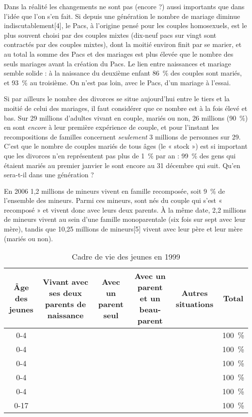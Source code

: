 
 Dans la réalité les changements ne sont pas (encore ?) aussi importants que dans l'idée que l'on s'en fait. Si depuis une génération le nombre de mariage diminue indiscutablement[4], le Pacs, à l'origine pensé pour les couples homosexuels, est le plus souvent choisi par des couples mixtes (dix-neuf pacs sur vingt sont contractés par des couples mixtes), dont la moitié environ finit par se marier, et au total la somme des Pacs et des mariages est plus élevée que le nombre des seuls mariages avant la création du Pacs. Le lien entre naissances et mariage semble solide : à la naissance du deuxième enfant 86~\% des couples sont mariés, et 93~\% au troisième. On n'est pas loin, avec le Pacs, d'un mariage à l'essai.

 Si par ailleurs le nombre des divorces se situe aujourd'hui entre le tiers et la moitié de celui des mariages, il faut considérer que ce nombre est à la fois élevé et bas. Sur 29 millions d'adultes vivant en couple, mariés ou non, 26 millions (90~\%) en sont \emph{encore} à leur première expérience de couple, et pour l'instant les recompositions de familles concernent \emph{seulement} 3 millions de personnes sur 29. C'est que le nombre de couples mariés de tous âges (le « stock ») est si important que les divorces n'en représentent pas plus de 1~\% par an : 99~\% des gens qui étaient mariés au premier janvier le sont encore au 31 décembre qui suit. Qu'en sera-t-il dans une génération ?

 En 2006 1,2 millions de mineurs vivent en famille recomposée, soit 9~\% de l'ensemble des mineurs. Parmi ces mineurs,  sont nés du couple qui s'est « recomposé » et vivent donc avec leurs deux parents. À la même date, 2,2 millions de mineurs vivent au sein d'une famille monoparentale (six fois sur sept avec leur mère), tandis que 10,25 millions de mineurs[5] vivent avec leur père et leur mère (mariés ou non). 
 

\begin{table}[h]
\centering
\caption{Cadre de vie des jeunes en 1999}
\begin{tabular*}{\linewidth}{cccccc}
Âge des jeunes & Vivant avec ses deux parents de naissance & Avec un parent seul & Avec un parent et un beau-parent & Autres situations & Total\\
\hline
 0-4 &  &  &  &  & 100~\% \\
 0-4 &  &  &  &  & 100~\% \\
 0-4 &  &  &  &  & 100~\% \\
 0-4 &  &  &  &  & 100~\% \\
 0-4 &  &  &  &  & 100~\% \\
\hline
 0-17 &  &  &  &  & 100~\%
\end{tabular*}
\end{table}
 

